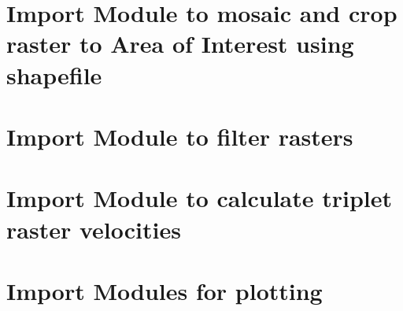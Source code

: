 \documentclass[letterpaper,10pt]{sphinxmanual}
\begin{document}
\section{Import Module to mosaic and crop raster to Area of Interest using shapefile}
\label{\detokenize{README:import-module-to-mosaic-and-crop-raster-to-area-of-interest-using-shapefile}}
\begin{sphinxVerbatim}[commandchars=\\\{\}]
    
\end{sphinxVerbatim}


\section{Import Module to filter rasters}
\label{\detokenize{README:import-module-to-filter-rasters}}
\begin{sphinxVerbatim}[commandchars=\\\{\}]
   
\end{sphinxVerbatim}


\section{Import Module to calculate triplet raster velocities}
\label{\detokenize{README:import-module-to-calculate-triplet-raster-velocities}}
\begin{sphinxVerbatim}[commandchars=\\\{\}]
    
 
\end{sphinxVerbatim}


\section{Import Modules for plotting}
\label{\detokenize{README:import-modules-for-plotting}}
\begin{sphinxVerbatim}[commandchars=\\\{\}]
   
   
   
   
\end{sphinxVerbatim}
\end{document}
